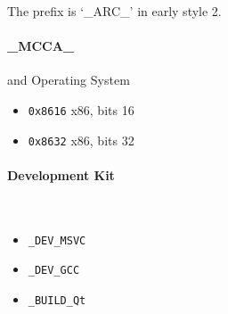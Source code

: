 The prefix is `\_ARC\_' in early style 2.

\paragraph{\_MCCA\_} and Operating System

\begin{itemize}
	\item \verb|0x8616| x86, bits 16
	\item \verb|0x8632| x86, bits 32
\end{itemize}

\paragraph{Development Kit} \
\begin{itemize}
\item \verb `_DEV_MSVC`
\item \verb `_DEV_GCC`
\item \verb `_BUILD_Qt` 
\end{itemize}
